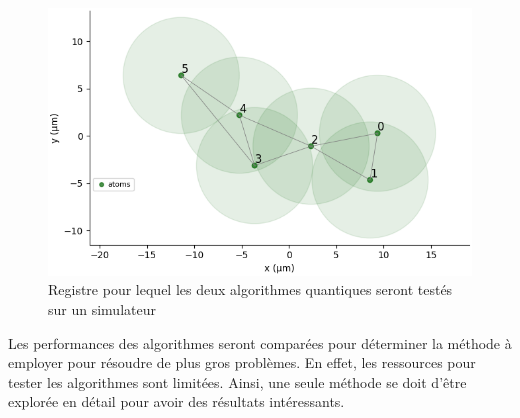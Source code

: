 \documentclass[11pt]{article}
\begin{document}
\begin{figure}[H]
    \centering
    \includegraphics[width = 0.48\linewidth]{images/registre_exemple2.png}
    \caption{Registre pour lequel les deux algorithmes quantiques seront testés sur un simulateur}
\end{figure}\label{graphtocompare}

Les performances des algorithmes seront comparées pour déterminer la méthode à employer pour résoudre de plus gros problèmes. En effet, les ressources pour tester les algorithmes sont limitées. Ainsi, une seule méthode se doit d'être explorée en détail pour avoir des résultats intéressants.
\end{document}
